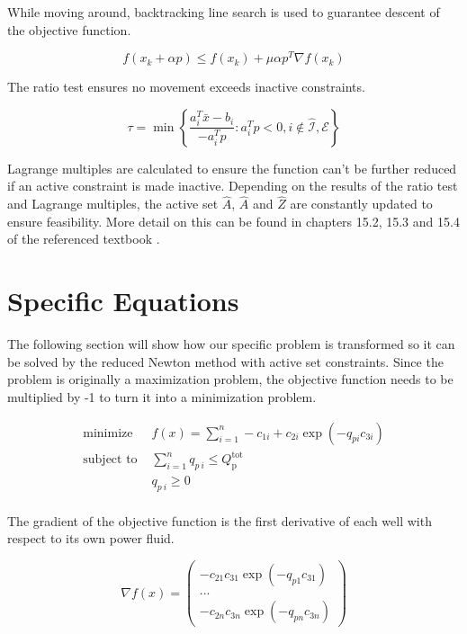 \documentclass{article}
\begin{document}
While moving around, backtracking line search is used to guarantee descent of the objective function.

$$f(x_{k} + \alpha p) \leq f(x_{k}) + \mu \alpha p^T \nabla f(x_k)$$

The ratio test ensures no movement exceeds inactive constraints. 

\begin{equation*}
        \tau = \min \left\{ \dfrac{a_i^T \bar{x} - b_{i}}{-a_i^T p} : a_i^T p < 0, i \notin \hat{\mathcal{I}}, \mathcal{E} \right \}
\end{equation*}

Lagrange multiples are calculated to ensure the function can't be further reduced if an active constraint is made inactive. Depending on the results of the ratio test and Lagrange multiples, the active set  $\hat{A}$, $\hat{A}$ and $\hat{Z}$ are constantly updated to ensure feasibility. More detail on this can be found in chapters 15.2, 15.3 and 15.4 of the referenced textbook \cite{optm_griva}.

\section{Specific Equations}

The following section will show how our specific problem is transformed so it can be solved by the reduced Newton method with active set constraints. Since the problem is originally a maximization problem, the objective function needs to be multiplied by -1 to turn it into a minimization problem.

\begin{equation*}
\begin{aligned}
    \text{minimize } & f(x) = \sum_{i=1}^{n} - c_{1i} + c_{2i} \exp{(-q_{pi} c_{3i})} \\
    \text{subject to } & \sum_{i=1}^{n} q_{p\:i} \leq Q_{\text{p}}^{\text{tot}} \\
    & q_{p\:i} \geq 0 \\
\end{aligned}
\end{equation*}

The gradient of the objective function is the first derivative of each well with respect to its own power fluid.

\begin{equation*}
    \nabla f(x) = 
    \begin{pmatrix}
    - c_{21} c_{31} \exp{(-q_{p1} c_{31})} \\[6pt]
    ... \\[6pt]
    - c_{2n} c_{3n} \exp{(-q_{pn} c_{3n})} 
    \end{pmatrix}
\end{equation*}
\end{document}
